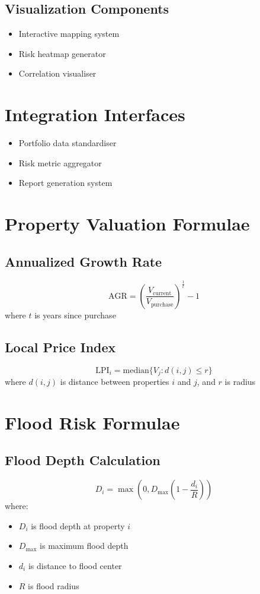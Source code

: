 \documentclass{article}
\begin{document}
\subsection{Visualization Components}
\begin{itemize}
    \item Interactive mapping system
    \item Risk heatmap generator
    \item Correlation visualiser
\end{itemize}

\section{Integration Interfaces}
\begin{itemize}
    \item Portfolio data standardiser
    \item Risk metric aggregator
    \item Report generation system
\end{itemize}

\section{Property Valuation Formulae}

\subsection{Annualized Growth Rate}
\[
\text{AGR} = \left(\frac{V_{\text{current}}}{V_{\text{purchase}}}\right)^{\frac{1}{t}} - 1
\]
where $t$ is years since purchase

\subsection{Local Price Index}
\[
\text{LPI}_i = \text{median}\{V_j : d(i,j) \leq r\}
\]
where $d(i,j)$ is distance between properties $i$ and $j$, and $r$ is radius

\section{Flood Risk Formulae}

\subsection{Flood Depth Calculation}
\[
D_i = \max\left(0, D_{\text{max}}\left(1 - \frac{d_i}{R}\right)\right)
\]
where:
\begin{itemize}
    \item $D_i$ is flood depth at property $i$
    \item $D_{\text{max}}$ is maximum flood depth
    \item $d_i$ is distance to flood center
    \item $R$ is flood radius
\end{itemize}
\end{document}
